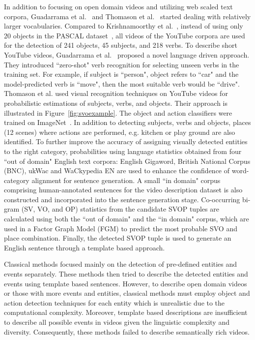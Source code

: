 \documentclass[10pt,journal,compsoc]{IEEEtran}
\begin{document}
In addition to focusing on open domain videos and utilizing web scaled text corpora, Guadarrama et al.~\cite{guadarrama2013youtube2text} and Thomason et al.~\cite{thomason2014integrating} started dealing with relatively larger vocabularies. Compared to Krishnamoorthy et al.~\cite{krishnamoorthy2013generating}, instead of using only 20 objects in the PASCAL dataset~\cite{everingham2010pascal}, all videos of the YouTube corpora are used for the detection of 241 objects, 45 subjects, and 218 verbs. To describe short YouTube videos, Guadarrama et al.~\cite{guadarrama2013youtube2text} proposed a novel language driven approach. They introduced ``zero-shot" verb recognition for selecting unseen verbs in the training set. For example, if subject is ``person", object refers to ``car" and the model-predicted verb is ``move", then the most suitable verb would be ``drive". Thomason et al. \cite{thomason2014integrating} used visual recognition techniques on YouTube videos for probabilistic estimations of subjects, verbs, and objects. Their approach is illustrated in Figure~\ref{fig:svoexample}. The object and action classifiers were trained on ImageNet~\cite{russakovsky2015imagenet}. In addition to detecting subjects, verbs and objects, places (12 scenes) where actions are performed, e.g. kitchen or play ground are also identified. To further improve the accuracy of assigning visually detected entities to the right category, probabilities using language statistics obtained from four ``out of domain" English text corpora: English Gigaword, British National Corpus (BNC), ukWac and WaCkypedia EN are used to enhance the confidence of word-category alignment for sentence generation. A small ``in domain" corpus comprising human-annotated sentences for the video description dataset is also constructed and incorporated into the sentence generation stage. Co-occurring bi-gram (SV, VO, and OP) statistics from the candidate SVOP tuples are calculated using both the ``out of domain" and the ``in domain" corpus, which are used in a Factor Graph Model (FGM) to predict the most probable SVO and place combination. Finally, the detected SVOP tuple is used to generate an English sentence through a template based approach. 

Classical methods focused mainly on the detection of pre-defined entities and events separately. These methods then tried to describe the detected entities and events using template based sentences. However, to describe open domain videos or those with more events and entities, classical methods must employ object and action detection techniques for each entity which is unrealistic due to the computational complexity. Moreover, template based descriptions are insufficient to describe all possible events in videos given the linguistic complexity and diversity. Consequently, these methods failed to describe semantically rich videos.
\end{document}
